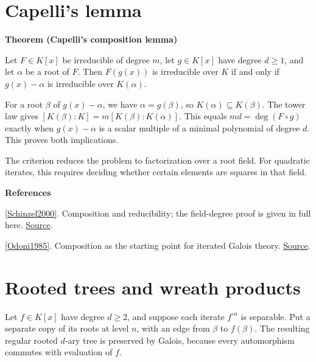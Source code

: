 \documentclass[11pt,a4paper,oneside,openany]{book}
\newenvironment{sources}{\par\smallskip\begingroup\footnotesize\color{atlasgray}\leftskip=10pt\setlength{\parskip}{2pt}}{\par\endgroup\smallskip}
\begin{document}
\section{Capelli's lemma}

\begin{atlasblock}[standard]
\textbf{\sffamily Theorem (Capelli's composition lemma)}\par\smallskip
\color{black} Let \(F\in K[x]\) be irreducible of degree \(m\), let \(g\in K[x]\) have degree \(d\ge1\), and let \(\alpha\) be a root of \(F\). Then \(F(g(x))\) is irreducible over \(K\) if and only if \(g(x)-\alpha\) is irreducible over \(K(\alpha)\).\par
\end{atlasblock}\color{black}

\begin{atlasblock}[standard]
\color{black} For a root \(\beta\) of \(g(x)-\alpha\), we have \(\alpha=g(\beta)\), so \(K(\alpha)\subseteq K(\beta)\). The tower law gives \([K(\beta):K]=m[K(\beta):K(\alpha)]\). This equals \(md=\deg(F\circ g)\) exactly when \(g(x)-\alpha\) is a scalar multiple of a minimal polynomial of degree \(d\). This proves both implications.\par
\end{atlasblock}\color{black}
\color{black} The criterion reduces the problem to factorization over a root field. For quadratic iterates, this requires deciding whether certain elements are squares in that field.\par
\begin{sources}
\textbf{References}\par\smallskip
\noindent\hyperlink{ref:Schinzel2000}{[Schinzel2000]}. Composition and reducibility; the field-degree proof is given in full here. \href{https://doi.org/10.1017/CBO9780511542916}{Source}.\par
\noindent\hyperlink{ref:Odoni1985}{[Odoni1985]}. Composition as the starting point for iterated Galois theory. \href{https://londmathsoc.onlinelibrary.wiley.com/doi/10.1112/plms/s3-51.3.385}{Source}.\par
\end{sources}\color{black}
\section{Rooted trees and wreath products}
\color{black} Let \(f\in K[x]\) have degree \(d\ge2\), and suppose each iterate \(f^{\circ n}\) is separable. Put a separate copy of its roots at level \(n\), with an edge from \(\beta\) to \(f(\beta)\). The resulting regular rooted \(d\)-ary tree is preserved by Galois, because every automorphism commutes with evaluation of \(f\).\par
\end{document}
